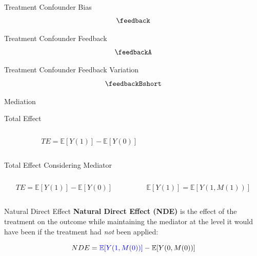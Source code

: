 \documentclass[
  ignorenonframetext,
  aspectratio=169,
]{beamer}
\begin{document}
\begin{frame}{Treatment Confounder Bias}
\label{treatment-confounder-bias}
\[\feedback\]
\end{frame}

\begin{frame}{Treatment Confounder Feedback}
\label{treatment-confounder-feedback}
\[\feedbackA\]
\end{frame}

\begin{frame}{Treatment Confounder Feedback Variation}
\label{treatment-confounder-feedback-variation}
\[\feedbackBshort\]
\end{frame}

\begin{frame}{Mediation}
\label{mediation}
\end{frame}

\begin{frame}{Total Effect}
\label{total-effect}
\begin{columns}[T]
\begin{column}{0.5\textwidth}
\[
TE = \mathbb{E}[Y(1)] - \mathbb{E}[Y(0)]
\]
\end{column}

\begin{column}{0.6\textwidth}
\[~~\]
\end{column}
\end{columns}
\end{frame}

\begin{frame}{Total Effect Considering Mediator}
\label{total-effect-considering-mediator}
\begin{columns}[T]
\begin{column}{0.5\textwidth}
\[
TE = \mathbb{E}[Y(1)] - \mathbb{E}[Y(0)]
\]
\end{column}

\begin{column}{0.5\textwidth}
\[ 
\mathbb{E}[Y(1)] = \mathbb{E}[Y(1, M(1))]
\]
\end{column}
\end{columns}
\end{frame}

\begin{frame}{Natural Direct Effect}
\label{natural-direct-effect}
\textbf{Natural Direct Effect (NDE)} is the effect of the treatment on
the outcome while maintaining the mediator at the level it would have
been if the treatment had \emph{not} been applied:

\[
 NDE = \textcolor{blue}{\mathbb{E}[Y(1, M(0))]} - \mathbb{E}[Y(0, M(0))]
\]
\end{frame}
\end{document}

